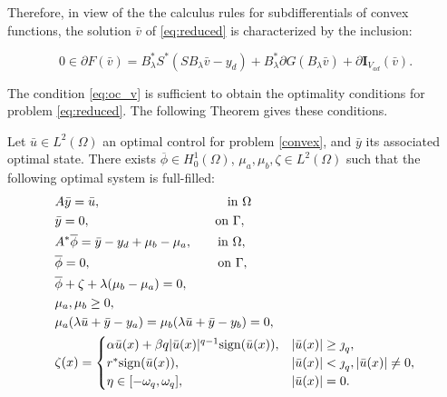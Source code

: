 Therefore, in view of the the calculus rules for subdifferentials of convex functions,  the solution  $\bar v$ of \eqref{eq:reduced} is characterized by the inclusion: 

\begin{equation}\label{eq:oc_v}
0 \in \partial F (\bar v)= B_\lambda^*S^*(SB_\lambda \bar v -y_d) + B_\lambda^* \partial G(B_\lambda \bar v) + \partial \mathbf{I}_{V_{ad}}(\bar v).
 \end{equation}


The condition \eqref{eq:oc_v} is sufficient to obtain the optimality conditions for problem 
\eqref{eq:reduced}.	The following Theorem gives these conditions.

\begin{theorem}
    Let $\bar{u}\in L^{2}(\Omega)$ an optimal control for problem 
	\eqref{convex}, and $\bar{y}$ its associated optimal state. There 
	exists $\overline{\phi}\in H_0^1(\Omega)$, $\mu_a, \mu_b, \zeta\in L^2(\Omega)$ such that the following optimal system is full-filled:    
	\begin{equation}\label{optimality_convex}
        \begin{split}         
        &A\bar{y}=\bar{u}, \hspace{3.5cm} \mbox{in }\Omega\\
        &\bar{y}=0, \hspace{3.45cm} \mbox{on }\Gamma,\\
        &A^*\overline{\phi}=\bar{y}-y_d+\mu_b-\mu_a, \qquad \mbox{in }\Omega,\\
        &\overline{\phi}=0,\hspace{3.5cm}\mbox{on }\Gamma,\\        
        &\overline{\phi}+\zeta+\lambda(\mu_b-\mu_a)=0,\\
        &\mu_a, \mu_b\ge 0,\\
        &\mu_a(\lambda \bar{u}+\bar{y}-y_a)=\mu_b(\lambda \bar{u}+\bar{y}-y_b)=0,\\
        &\zeta(x)=\begin{cases}
            \alpha \bar{u}(x)+\beta q |\bar{u}(x)|^{q-1}\sign(\bar{u}(x)), &|\bar{u}(x)|\ge \jump_q,\\
            r^*\sign(\bar{u}(x)), &|\bar{u}(x)|<\jump_q, |\bar{u}(x)|\ne 0,\\
            \eta \in [-\omega_q,\omega_q],& |\bar{u}(x)|=0.
        \end{cases}  
        \end{split}
    \end{equation}    
\end{theorem}
